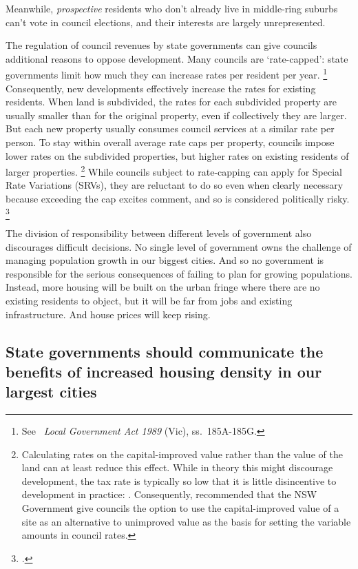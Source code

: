Meanwhile, \emph{prospective} residents who don't already live in middle-ring suburbs can't vote in council elections, and their interests are largely unrepresented.

The regulation of council revenues by state governments can give councils additional reasons to oppose development.
Many councils are `rate-capped': state governments limit how much they can increase rates per resident per year.%
	\footnote{See \eg~\textit{Local Government Act 1989} (Vic), ss.\ 185A-185G.}
Consequently, new developments effectively increase the rates for existing residents.
When land is subdivided, the rates for each subdivided property are usually smaller than for the original property, even if collectively they are larger.
But each new property usually consumes council services at a similar rate per person.
To stay within overall average rate caps per property, councils impose lower rates on the subdivided properties, but higher rates on existing residents of larger properties.%
	\footnote{Calculating rates on the capital-improved value rather than the value of the land can at least reduce this effect.
	While in theory this might discourage development, the tax rate is typically so low that it is little disincentive to development in practice: \textcite[][4]{DaleyCoates-2015-Property-taxes}.
	Consequently, \textcite{IPART-2016-Review-of-local-govt-rating-sys} recommended that the NSW Government give councils the option to use the capital-improved value of a site as an alternative to unimproved value as the basis for setting the variable amounts in council rates.}
While councils subject to rate-capping can apply for Special Rate Variations (SRVs), they are reluctant to do so even when clearly necessary because exceeding the cap excites comment, and so is considered politically risky.%
\footcites[][42]{Sansom-NSW-Ind-Local-Govt-Review-2013}{IPART-2012-submission-to-Local-Govt-Review}

The division of responsibility between different levels of government also discourages difficult decisions.
No single level of government owns the challenge of managing population growth in our biggest cities.
And so no government is responsible for the serious consequences of failing to plan for growing populations.
Instead, more housing will be built on the urban fringe where there are no existing residents to object, but it will be far from jobs and existing infrastructure.
And house prices will keep rising.

\subsection{State governments should communicate the benefits of increased housing density in our largest cities }\label{subsec:state-governments-need-to-communicate-the-benefits-of-increased-housing-density-in-our-largest-cities}

